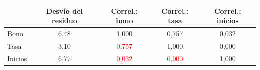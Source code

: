 \begin{tabular}{lcccc}
\toprule
 & Desv\'io del residuo & Correl.: bono & Correl.: tasa & Correl.: inicios
\\ \midrule
Bono & 6{,}48 & 1{,}000 & 0{,}757 & 0{,}032 \\
Tasa & 3{,}10 & \textcolor{red}{0{,}757} & 1{,}000 & 0{,}000 \\
Inicios & 6{,}77 & \textcolor{red}{0{,}032} & \textcolor{red}{0{,}000} & 1{,}000 \\
\bottomrule
\end{tabular}
